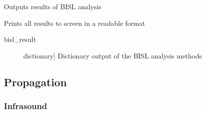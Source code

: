 \documentclass[letterpaper,10pt,english]{sphinxmanual}
\begin{document}
\begin{fulllineitems}
\label{\detokenize{infrapy.location:infrapy.location.bisl.summarize}}
Outputs results of BISL analysis

Prints all results to screen in a readable format
\begin{description}
\item[{bisl\_result}] \leavevmode{[}dictionary{]}
Dictionary output of the BISL analysis methods

\end{description}

\end{fulllineitems}



\subsection{Propagation}
\label{\detokenize{infrapy.propagation:propagation}}\label{\detokenize{infrapy.propagation::doc}}

\subsubsection{Infrasound}
\label{\detokenize{infrapy.propagation:module-infrapy.propagation.infrasound}}\label{\detokenize{infrapy.propagation:infrasound}}
\end{document}
